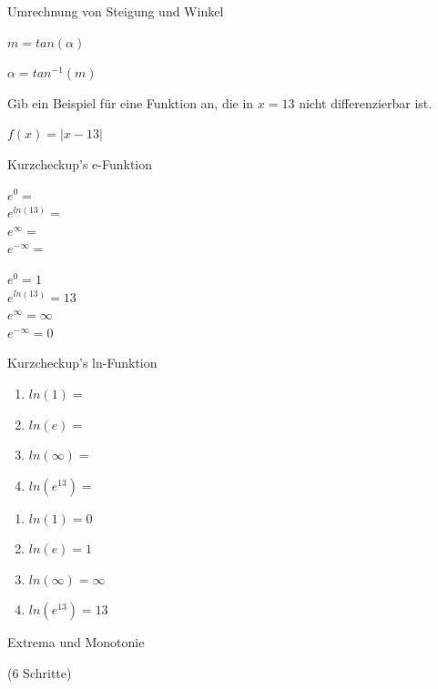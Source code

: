 \documentclass[paper=a6,landscape,ngerman,twoside=true,fontsize=12pt]{scrartcl}
\begin{document}
\begin{frage}
	Umrechnung von Steigung und Winkel
\end{frage}
\begin{antwort}
	 $m=tan(\alpha)$
	 
	 $\alpha=tan^{-1}(m)$
\end{antwort}
\begin{frage}
	Gib ein Beispiel für eine Funktion an, die in $x=13$ nicht differenzierbar ist.
\end{frage}
\begin{antwort}
	$f(x)=|x-13|$
\end{antwort}

\begin{frage}
		Kurzcheckup's e-Funktion
		\begin{center}
				$e^0=$\\
				$e^{ln(13)}=$\\
				$e^\infty=$\\
				$e^{-\infty}=$				
		\end{center}
\end{frage}
\begin{antwort}
	\begin{center}
		$e^0=1$\\
		$e^{ln(13)}=13$\\
		$e^\infty=\infty$\\
		$e^{-\infty}=0$				
	\end{center}
\end{antwort}
\begin{frage}
	Kurzcheckup's ln-Funktion
	\begin{enumerate}
		\item $ln(1)=$
		\item $ln(e)=$
		\item $ln(\infty)=$
		\item $ln(e^{13})=$				
	\end{enumerate}
\end{frage}
\begin{antwort}
	\begin{enumerate}
		\item $ln(1)=0$
		\item $ln(e)=1$
		\item $ln(\infty)=\infty$
		\item $ln(e^{13})=13$					
	\end{enumerate}
\end{antwort}
\begin{frage}
	Extrema und Monotonie \bigskip 
	
	(6 Schritte)	
\end{frage}
\end{document}
